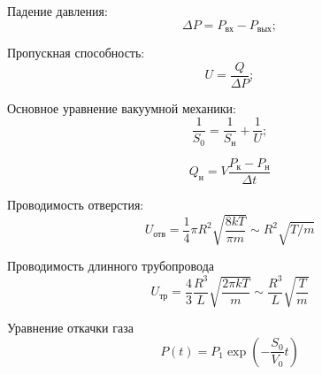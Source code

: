 \documentclass[a4paper, 12pt]{article}
\begin{document}
        Падение давления:
        \begin{equation}
            \Delta P = P_{\text{вх}} - P_{\text{вых}};
        \end{equation}

        Пропускная способность:
        \begin{equation}
            U = \frac{Q}{\Delta P};
        \end{equation}

        Основное уравнение вакуумной механики:
        \begin{equation}
            \frac{1}{S_{0}} = \frac{1}{S_{\text{н}}} + \frac{1}{U};
        \end{equation} 

        \begin{equation}
            Q_{\text{н}} = V\frac{P_{\text{к}} - P_{\text{н}}}{\Delta t}		
        \end{equation}

        Проводимость отверстия:
        \begin{equation}
            U_{\text{отв}} = \frac{1}{4} \pi R^{2} \sqrt{\frac{8kT}{\pi m}} \sim R^{2}\sqrt{T/m}
        \end{equation}

        Проводимость длинного трубопровода
        \begin{equation}
            U_{\text{тр}} = \frac{4}{3} \frac{R^{3}}{L} \sqrt{\frac{2\pi kT}{m}} \sim \frac{R^{3}}{L} \sqrt{\frac{T}{m}} 
        \end{equation}

        Уравнение откачки газа
        \begin{equation}
            P\left( t \right) = P_{1}\exp \left(- \frac{S_{0}}{V_{0}}t \right)
        \end{equation}
            
\end{document}
